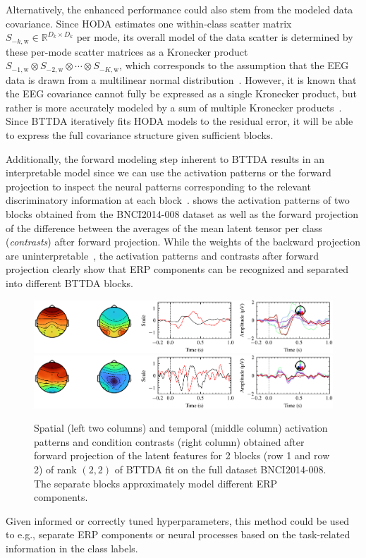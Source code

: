 Alternatively, the enhanced performance could also stem from the modeled data
covariance.
Since HODA estimates one within-class scatter matrix
$S_{-k,\text{w}}\in\mathbb{R}^{D_k\times D_k}$ per mode, its overall
model of the data scatter is determined by these per-mode scatter matrices as a
Kronecker product $S_{-1,\text{w}}\otimes S_{-2,\text{w}}\otimes\cdots\otimes S_{-K,\text{w}}$, which corresponds to the assumption that the EEG data is
drawn from a multilinear normal distribution~\cite{Ohlson2013}.
However, it is known that the EEG covariance cannot fully be expressed as a
single Kronecker product, but rather is more accurately modeled by a sum of
multiple Kronecker products~\cite{Bijma2005, Sosulski2022}.
Since BTTDA iteratively fits HODA models to the residual error, it will be able
to express the full covariance structure given sufficient blocks.

Additionally, the forward modeling step inherent to BTTDA results
in an interpretable model since we can use the activation patterns or the
forward projection to inspect the neural patterns corresponding to the
relevant discriminatory information at each block~\cite{Haufe2014}.
 shows the activation patterns
of two blocks obtained from the BNCI2014-008 dataset as well as the forward
projection of the difference between the averages of the mean latent tensor per
class (\emph{contrasts}) after forward projection.
While the weights of the backward projection are
uninterpretable~\cite{Haufe2014},
the activation patterns and contrasts after forward projection clearly show
that ERP components can be recognized and separated into different
BTTDA blocks.
\begin{figure}[t]
	\includegraphics[width=\linewidth]{figures/bttda/forward_block-0.png}
	\includegraphics[width=\linewidth]{figures/bttda/forward_block-1.png}
  \caption[Extracted \acs{bttda} activation patterns.]{%
    Spatial (left two columns) and temporal (middle column) activation patterns and
		condition contrasts (right column) obtained after forward projection of the latent
		features for 2 blocks (row 1 and row 2) of rank $(2,2)$ of BTTDA
		fit on the full dataset BNCI2014-008.
		The separate blocks approximately model different ERP
		components.}
	\label{fig:forward}
\end{figure}
Given informed or correctly tuned hyperparameters, this method could be used to
e.g., separate ERP components or neural processes based on the task-related
information in the class labels.


